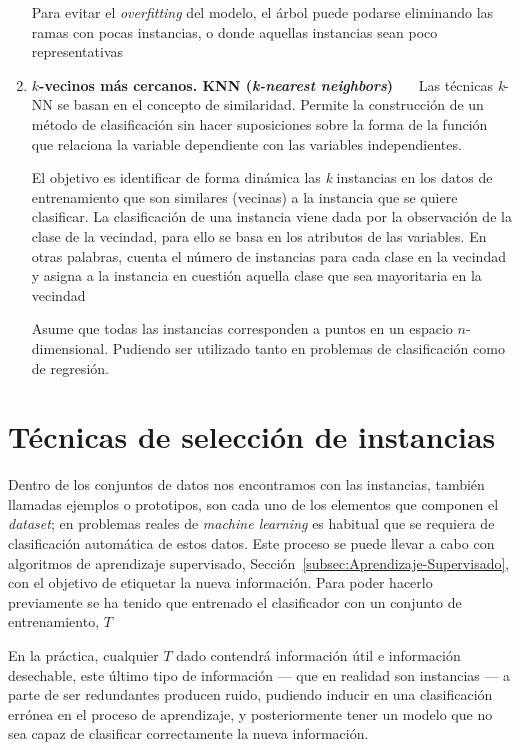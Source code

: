 \begin{enumerate}
	Para evitar el \textit{overfitting} del modelo, el árbol puede podarse eliminando las ramas con pocas instancias, o donde aquellas instancias sean poco representativas~\cite{palmer2011data}
	
	\item \textbf{$k$-vecinos más cercanos. KNN (\textit{k-nearest neighbors})}~\cite{guo2003knn}~\cite{hand2007principles}~\cite{palmer2011data} Las técnicas \textit{k}-NN se basan en el concepto de similaridad. Permite la construcción de un método de clasificación sin hacer suposiciones sobre la forma de la función que relaciona la variable dependiente con las variables independientes.
	
	El objetivo es identificar de forma dinámica las \textit{k} instancias en los datos de entrenamiento que son similares (vecinas) a la instancia que se quiere clasificar. La clasificación de una instancia viene dada por la observación de la clase de la vecindad, para ello se basa en los atributos de las variables. En otras palabras, cuenta el número de instancias para cada clase en la vecindad y asigna a la instancia en cuestión aquella clase que sea mayoritaria en la vecindad~\cite{potomac1999introduction}
	
	Asume que todas las instancias corresponden a puntos en un espacio $n$-dimensional. Pudiendo ser utilizado tanto en problemas de clasificación como de regresión.
\end{enumerate}

\section{Técnicas de selección de instancias}\label{sec:tecnicas-seleccion-instancias}
Dentro de los conjuntos de datos nos encontramos con las instancias, también llamadas ejemplos o prototipos, son cada uno de los elementos que componen el \textit{dataset}; en problemas reales de \textit{machine learning} es habitual que se requiera de clasificación automática de estos datos. Este proceso se puede llevar a cabo con algoritmos de aprendizaje supervisado, Sección~\ref{subsec:Aprendizaje-Supervisado}, con el objetivo de etiquetar la nueva información. Para poder hacerlo previamente se ha tenido que entrenado el clasificador con un conjunto de entrenamiento, $T$~\cite{olvera2010review}

En la práctica, cualquier $T$ dado contendrá información útil e información desechable, este último tipo de información --- que en realidad son instancias --- a parte de ser redundantes producen ruido, pudiendo inducir en una clasificación errónea en el proceso de aprendizaje, y posteriormente tener un modelo que no sea capaz de clasificar correctamente la nueva información.

